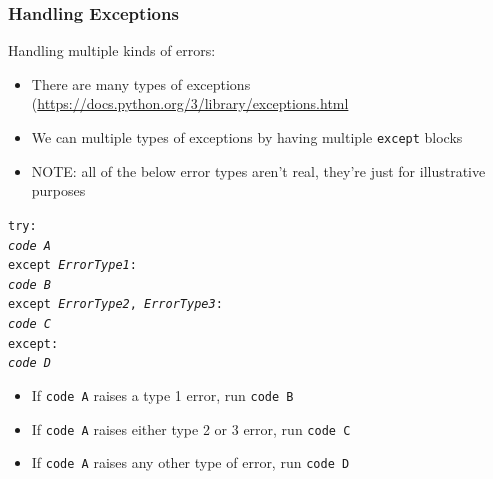 \documentclass{beamer}
\newcommand{\code}[1]{\texttt{#1}}
\newcommand{\tab}{\hspace*{22pt}}
\begin{document}
\begin{frame}	
	\frametitle{Handling Exceptions}
	
	\begin{block}{Handling multiple kinds of errors:}
		\begin{itemize}
			\item There are many types of exceptions (\href{https://docs.python.org/3/library/exceptions.html}{https://docs.python.org/3/library/exceptions.html}
			\item We can multiple types of exceptions by having multiple \code{except} blocks
			\item NOTE: all of the below error types aren't real, they're just for illustrative purposes
		\end{itemize}
		
		\vspace{10pt}

			\code{try: \\
					\tab \emph{code A} \\
					except \emph{ErrorType1}: \\
					\tab \emph{code B} \\
					except \emph{ErrorType2}, \emph{ErrorType3}: \\
					\tab \emph{code C} \\
					except: \\
					\tab \emph{code D} \\
			}
		\endminipage\hfill
			\begin{itemize}
				\item If \code{code A} raises a type 1 error, run \code{code B}
				\item If \code{code A} raises either type 2 or 3 error, run \code{code C}
				\item If \code{code A} raises any other type of error, run \code{code D}
			\end{itemize}
		\endminipage\hfill
	\end{block}
	
\end{frame}
\end{document}

